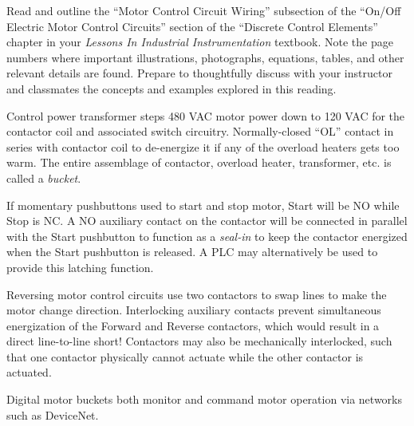 

Read and outline the ``Motor Control Circuit Wiring'' subsection of the ``On/Off Electric Motor Control Circuits'' section of the ``Discrete Control Elements'' chapter in your {\it Lessons In Industrial Instrumentation} textbook.  Note the page numbers where important illustrations, photographs, equations, tables, and other relevant details are found.  Prepare to thoughtfully discuss with your instructor and classmates the concepts and examples explored in this reading.














Control power transformer steps 480 VAC motor power down to 120 VAC for the contactor coil and associated switch circuitry.  Normally-closed ``OL'' contact in series with contactor coil to de-energize it if any of the overload heaters gets too warm.  The entire assemblage of contactor, overload heater, transformer, etc. is called a {\it bucket}.

\vskip 10pt

If momentary pushbuttons used to start and stop motor, Start will be NO while Stop is NC.  A NO auxiliary contact on the contactor will be connected in parallel with the Start pushbutton to function as a {\it seal-in} to keep the contactor energized when the Start pushbutton is released.  A PLC may alternatively be used to provide this latching function.

\vskip 10pt

Reversing motor control circuits use two contactors to swap lines to make the motor change direction.  Interlocking auxiliary contacts prevent simultaneous energization of the Forward and Reverse contactors, which would result in a direct line-to-line short!  Contactors may also be mechanically interlocked, such that one contactor physically cannot actuate while the other contactor is actuated.

\vskip 10pt

Digital motor buckets both monitor and command motor operation via networks such as DeviceNet.











